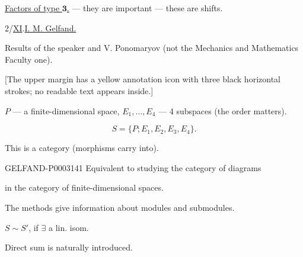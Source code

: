 \uline{Factors of type $\mathbf3$.} --- they are important --- these are shifts.



2/\underline{XI}.\qquad\underline{I. M. Gelfand.}

Results of the speaker and V. Ponomaryov (not the Mechanics and Mathematics Faculty one).

[The upper margin has a yellow annotation icon with three black horizontal strokes; no readable text appears inside.]

$P$ --- a finite-dimensional space, $E_1,\ldots, E_4$ --- 4 subspaces (the order matters).

\begin{equation*}S=\{P; E_1, E_2, E_3, E_4\}.\end{equation*}

This is a category (morphisms carry into).

\begin{GelfandAdjacentEvidence}{GELFAND-P000314}{1}
Equivalent to studying the category of diagrams





\end{GelfandAdjacentEvidence}


in the category of finite-dimensional spaces.

The methods give information about modules and submodules.

$S\sim S'$, if $\exists$ a lin. isom.

Direct sum is naturally introduced.

